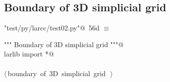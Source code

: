 \documentclass[11pt,oneside]{article}    %
\begin{document}
\subsection{Boundary of 3D simplicial grid}

\begin{flushleft} \small
\begin{minipage}{\linewidth} \label{scrap98}
\protect{}\verb@"test/py/larcc/test02.py"@\nobreak\ {\footnotesize 56d }$\equiv$
\vspace{-1ex}
\begin{list}{}{} \item
\mbox{}\verb@""" Boundary of 3D simplicial grid """@\\
\mbox{}\verb@from larlib import *@\\
\mbox{}\verb@@\\
\mbox{}\verb@@\hbox{$\langle\,$boundary of 3D simplicial grid\nobreak\ {\footnotesize {}}$\,\rangle$}\verb@@\\
\mbox{}\verb@@{\NWsep}
\end{list}
\vspace{-2ex}
\end{minipage}\\[4ex]
\end{flushleft}
\end{document}
